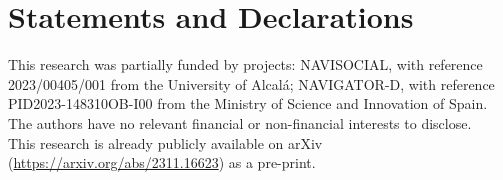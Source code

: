 \section*{Statements and Declarations}
This research was partially funded by projects: NAVISOCIAL, with reference 2023/00405/001 from the University of Alcal\'a; NAVIGATOR-D, with reference PID2023-148310OB-I00 from the Ministry of Science and Innovation of Spain.\\
The authors have no relevant financial or non-financial interests to disclose. \\
This research is already publicly available on arXiv (\url{https://arxiv.org/abs/2311.16623}) as a pre-print. \\

